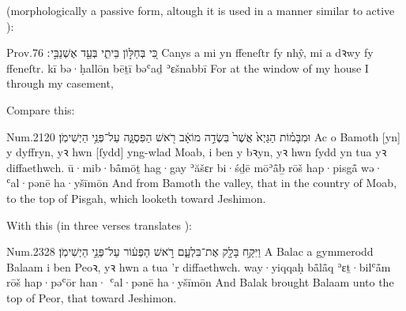  (morphologically a passive form, altough it is used in a manner similar to active ):
\begin{example}{Prov.}{7}{6}{}{}
	\quoling
	{כִּ֭י בְּחַלּ֣וֹן בֵּיתִ֑י בְּעַ֖ד אֶשְׁנַבִּ֣י ׃}
	{Canys a mi yn ffeneſtr fy nhŷ, mi a  dꝛwy fy ffeneſtr.}
	{kī bə·ḥallōn bēṯī bəʿaḏ ʾɛšnabbī }
	{For at the window of my house I  through my casement,}
\end{example}

Compare this:
\begin{example}{Num.}{21}{20}{}{}
	\quoling
	{וּמִבָּמ֗וֹת הַגַּיְא֙ אֲשֶׁר֙ בִּשְׂדֵ֣ה מוֹאָ֔ב רֹ֖אשׁ הַפִּסְגָּ֑ה  עַל־פְּנֵ֥י הַיְשִׁימֹֽן׃}
	{Ac o Bamoth [yn] y dyffryn, yꝛ hwn [ſydd] yng-wlad Moab, i ben y bꝛyn, yꝛ hwn ſydd yn  tua yꝛ diffaethwch.}
	{ū·mib·bå̄mōṯ hag·gay ʾăšɛr bi·śḏē mōʾå̄ḇ rōš hap·pisgå̄ wə· ʿal·pənē ha·yšīmōn}
	{And from Bamoth  the valley, that  in the country of Moab, to the top of Pisgah, which looketh toward Jeshimon.}
\end{example}

With this (in three verses  translates ):
\begin{example}{Num.}{23}{28}{}{}
	\quoling
	{וַיִּקַּ֥ח בָּלָ֖ק אֶת־בִּלְעָ֑ם רֹ֣אשׁ הַפְּע֔וֹר  עַל־פְּנֵ֥י הַיְשִׁימֹֽן׃}
	{A Balac a gymmerodd Balaam i ben Peoꝛ, yꝛ hwn a  tua ’r diffaethwch.}
	{way·yiqqaḥ bå̄lå̄q ʾɛṯ·bilʿå̄m rōš hap·pəʿōr han· ʿal·pənē ha·yšīmōn}
	{And Balak brought Balaam unto the top of Peor, that  toward Jeshimon.}
\end{example}









